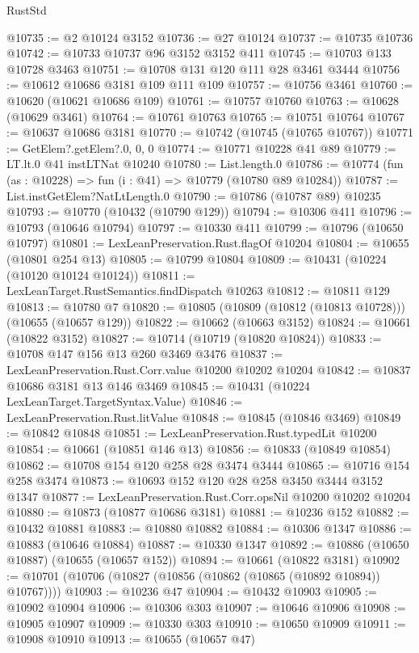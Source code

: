 \begin{lexlean}{RustStd}
\begin{coremodule}
@10735 := @2 @10124 @3152
@10736 := @27 @10124
@10737 := @10735 @10736
@10742 := @10733 @10737 @96 @3152 @3152 @411
@10745 := @10703 @133 @10728 @3463
@10751 := @10708 @131 @120 @111 @28 @3461 @3444
@10756 := @10612 @10686 @3181 @109 @111 @109
@10757 := @10756 @3461
@10760 := @10620 (@10621 @10686 @109)
@10761 := @10757 @10760
@10763 := @10628 (@10629 @3461)
@10764 := @10761 @10763
@10765 := @10751 @10764
@10767 := @10637 @10686 @3181
@10770 := @10742 (@10745 (@10765 @10767))
@10771 := GetElem?.getElem?.{0, 0, 0}
@10774 := @10771 @10228 @41 @89
@10779 := LT.lt.{0} @41 instLTNat @10240
@10780 := List.length.{0}
@10786 := @10774 (fun (as : @10228) => fun (i : @41) => @10779 (@10780 @89 @10284))
@10787 := List.instGetElem?NatLtLength.{0}
@10790 := @10786 (@10787 @89) @10235
@10793 := @10770 (@10432 (@10790 @129))
@10794 := @10306 @411
@10796 := @10793 (@10646 @10794)
@10797 := @10330 @411
@10799 := @10796 (@10650 @10797)
@10801 := LexLeanPreservation.Rust.flagOf @10204
@10804 := @10655 (@10801 @254 @13)
@10805 := @10799 @10804
@10809 := @10431 (@10224 (@10120 @10124 @10124))
@10811 := LexLeanTarget.RustSemantics.findDispatch @10263
@10812 := @10811 @129
@10813 := @10780 @7
@10820 := @10805 (@10809 (@10812 (@10813 @10728))) (@10655 (@10657 @129))
@10822 := @10662 (@10663 @3152)
@10824 := @10661 (@10822 @3152)
@10827 := @10714 (@10719 (@10820 @10824))
@10833 := @10708 @147 @156 @13 @260 @3469 @3476
@10837 := LexLeanPreservation.Rust.Corr.value @10200 @10202 @10204
@10842 := @10837 @10686 @3181 @13 @146 @3469
@10845 := @10431 (@10224 LexLeanTarget.TargetSyntax.Value)
@10846 := LexLeanPreservation.Rust.litValue
@10848 := @10845 (@10846 @3469)
@10849 := @10842 @10848
@10851 := LexLeanPreservation.Rust.typedLit @10200
@10854 := @10661 (@10851 @146 @13)
@10856 := @10833 (@10849 @10854)
@10862 := @10708 @154 @120 @258 @28 @3474 @3444
@10865 := @10716 @154 @258 @3474
@10873 := @10693 @152 @120 @28 @258 @3450 @3444 @3152 @1347
@10877 := LexLeanPreservation.Rust.Corr.opsNil @10200 @10202 @10204
@10880 := @10873 (@10877 @10686 @3181)
@10881 := @10236 @152
@10882 := @10432 @10881
@10883 := @10880 @10882
@10884 := @10306 @1347
@10886 := @10883 (@10646 @10884)
@10887 := @10330 @1347
@10892 := @10886 (@10650 @10887) (@10655 (@10657 @152))
@10894 := @10661 (@10822 @3181)
@10902 := @10701 (@10706 (@10827 (@10856 (@10862 (@10865 (@10892 @10894)) @10767))))
@10903 := @10236 @47
@10904 := @10432 @10903
@10905 := @10902 @10904
@10906 := @10306 @303
@10907 := @10646 @10906
@10908 := @10905 @10907
@10909 := @10330 @303
@10910 := @10650 @10909
@10911 := @10908 @10910
@10913 := @10655 (@10657 @47)

\end{coremodule}
\end{lexlean}

